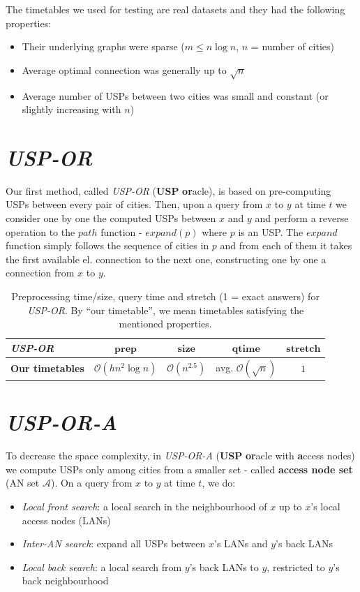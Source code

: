 \documentclass[myposter,portrait]{sciposter}
\def\mysection#1{
{\color{sectionCol}\section*{\sc\bfseries #1}}}
\begin{document}
\begin{multicols*}{3}
	The timetables we used for testing are real datasets and they had the following properties:
	\begin{itemize}
		\item Their underlying graphs were sparse ($m \leq n \log n$, $n$ = number of cities)
		\item Average optimal connection was generally up to $\sqrt{n}$ 
		\item Average number of USPs between two cities was small and constant (or slightly increasing with $n$)
	\end{itemize}
	\hspace{\fill}

\mysection{\textit{USP-OR}}

	Our first method, called \textit{USP-OR} (\textbf{USP} \textbf{or}acle), is based on pre-computing USPs between every pair of cities. Then, upon a query from $x$ to $y$ at time $t$ we consider one by one the computed USPs between $x$ and $y$ and perform a reverse operation to the $path$ function - $expand(p)$ where $p$ is an USP. The $expand$ function simply follows the sequence of cities in $p$ and from each of them it takes the first available el. connection to the next one, constructing one by one a connection from $x$ to $y$. 
	
	\begin{table}[h!]
		\centering
		\begin{tabular}{l|c|c|c|c}
			\cellcolor{oracle-clr} \textit{\textbf{USP-OR}} & \cellcolor{oracle-clr} $\bm{prep}$ & \cellcolor{oracle-clr} $\bm{size}$ & \cellcolor{oracle-clr} $\bm{qtime}$ & \cellcolor{oracle-clr} $\bm{stretch}$ \\
			\hline
			\cellcolor{oracle-clr} \textbf{Our timetables} & $\mathcal{O}(hn^{2} \log n)$ & $\mathcal{O}(n^{2.5})$ & avg. $\mathcal{O}(\sqrt{n})$ & $1$ \\
		\end{tabular}
		\caption{\label{tab:uspor} Preprocessing time/size, query time and stretch (1 = exact answers) for \textit{USP-OR}. By ``our timetable'', we mean timetables satisfying the mentioned properties.}
	\end{table}	

\mysection{\textit{USP-OR-A}}

	To decrease the space complexity, in \textit{USP-OR-A} (\textbf{USP} \textbf{or}acle with \textbf{a}ccess nodes) we compute USPs only among cities from a smaller set - called \textbf{access node set} (AN set $\bm{\mathcal{A}}$). On a query from $x$ to $y$ at time $t$, we do:
	\begin{itemize}
		\item \textit{Local front search}: a local search in the neighbourhood of $x$ up to $x$'s local access nodes (LANs)
		\item \textit{Inter-AN search}: expand all USPs between $x$'s LANs and $y$'s back LANs
		\item \textit{Local back search}: a local search from $y$'s back LANs to $y$, restricted to $y$'s back neighbourhood
	\end{itemize}		


\end{multicols*}
\end{document}
